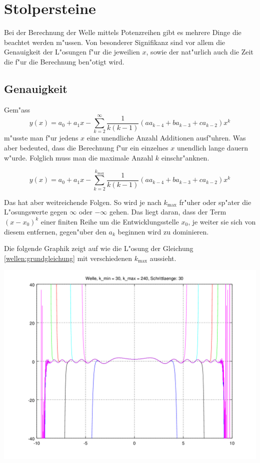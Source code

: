 \section{Stolpersteine}

Bei der Berechnung der Welle mittels Potenzreihen gibt es mehrere Dinge die 
beachtet werden m"ussen. Von besonderer Signifikanz sind vor allem die 
Genauigkeit der L"osungen f"ur die jeweilien $x$, sowie der nat"urlich auch die 
Zeit die f"ur die Berechnung ben"otigt wird.


\subsection{Genauigkeit}
Gem"ass
\begin{equation*}
	y(x) = a_0 + a_1x 
	-\sum_{k=2}^{\infty}\frac{1}{k(k-1)}(aa_{k-4}+ba_{k-3}+ca_{k-2})x^k
\end{equation*}
m"usste man f"ur jedens $x$ eine unendliche Anzahl Additionen ausf"uhren. Was 
aber bedeuted, dass die Berechnung f"ur ein einzelnes $x$ unendlich lange 
dauern w"urde. Folglich muss man die maximale Anzahl $k$ einschr"anknen.

\begin{equation*}
	y(x) = a_0 + a_1x 
	-\sum_{k=2}^{k_{\text{max}}}\frac{1}{k(k-1)}(aa_{k-4}+ba_{k-3}+ca_{k-2})x^k
\end{equation*}

Das hat aber weitreichende Folgen. So wird je nach $k_{\text{max}}$ fr"uher 
oder sp"ater die L"osungswerte gegen $\infty$ oder $-\infty$ gehen. Das liegt 
daran, dass der Term $(x - x_0)^k$ einer finiten Reihe um die 
Entwicklungsstelle $x_0$, je weiter sie sich von diesem entfernen, gegen"uber 
den $a_k$ beginnen wird zu dominieren.

Die folgende Graphik zeigt auf wie die L"osung der Gleichung 
\ref{wellen:grundgleichung} mit verschiedenen $k_{\text{max}}$ aussieht.

\begin{center}
	\includegraphics[scale=0.65]{./wellen/images/kmax/krangewaveeven.png}
\end{center}

